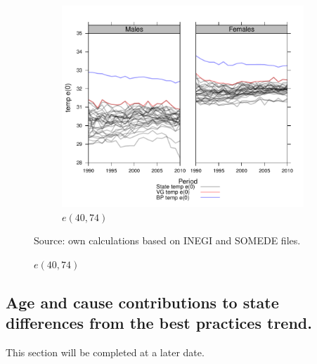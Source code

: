 \documentclass{article}
\begin{document}
\begin{figure}
\begin{subfigure}{\textwidth}
\end{subfigure}
\\
\begin{subfigure}{\textwidth}
\centering
\caption{$e(40,74)$}
\vspace{-2em}
\label{fig:e40_74}
\includegraphics[scale=.5]{Figures/et40_74.pdf}
\end{subfigure}
Source: own calculations based on INEGI and SOMEDE files. 
\end{figure}

\FloatBarrier

\subsection*{Age and cause contributions to state differences from the best
practices trend.}
This section will be completed at a later date.
\end{document}
